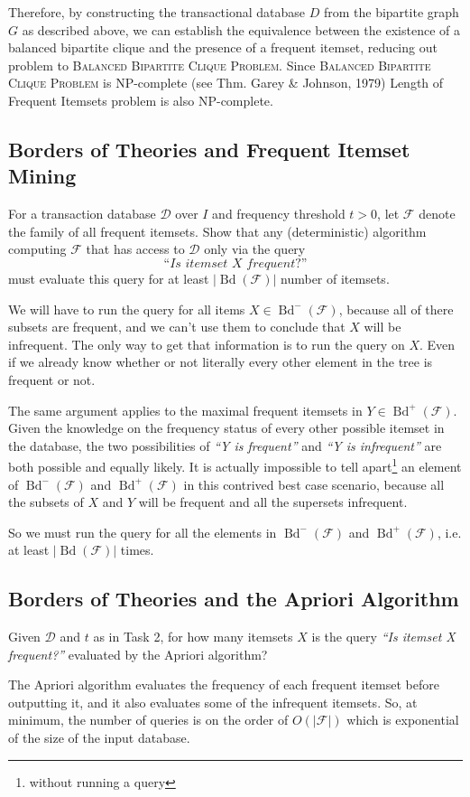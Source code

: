 \documentclass{article}
\begin{document}
  Therefore, by constructing the transactional database $D$ from the bipartite graph $G$ as described above, we can establish the equivalence between the existence of a balanced bipartite clique and the presence of a frequent itemset, reducing out problem to \textsc{Balanced Bipartite Clique Problem}.
  Since \textsc{Balanced Bipartite Clique Problem} is NP-complete (see Thm. Garey \& Johnson, 1979) Length of Frequent Itemsets problem is also NP-complete.

  \subsection{Borders of Theories and Frequent Itemset Mining}
  \begin{centerframebox}
    For a transaction database $\mathcal{D}$ over $I$ and frequency threshold $t > 0$, let $\mathcal{F}$
    denote the family of all frequent itemsets. Show that any (deterministic)
    algorithm computing $\mathcal{F}$ that has access to $\mathcal{D}$ only via the query
    \[\textit{``Is itemset X frequent?''}\]
    must evaluate this query for at least $|\operatorname{Bd}(\mathcal{F})|$ number of itemsets.
  \end{centerframebox}
  We will have to run the query for all items $X \in \operatorname{Bd}^-(\mathcal{F})$,
  because all of there subsets are frequent, and we can't use them to conclude that $X$ will be infrequent.
  The only way to get that information is to run the query on $X$.
  Even if we already know whether or not literally every other element in the tree is frequent or not.

  The same argument applies to the maximal frequent itemsets in $Y \in \operatorname{Bd}^+(\mathcal{F})$.
  Given the knowledge on the frequency status of every other possible itemset in the database,
  the two possibilities of \textit{``Y is frequent''} and \textit{``Y is infrequent''} are both possible and equally likely.
  It is actually impossible to tell apart\footnote{without running a query}
  an element of $\operatorname{Bd}^-(\mathcal{F})$ and $\operatorname{Bd}^+(\mathcal{F})$
  in this contrived best case scenario, because all the subsets of $X$ and $Y$ will be frequent and all the supersets infrequent.

  So we must run the query for all the elements in $\operatorname{Bd}^-(\mathcal{F})$ and $\operatorname{Bd}^+(\mathcal{F})$,
  i.e. at least $|\operatorname{Bd}(\mathcal{F})|$ times.

  \subsection{Borders of Theories and the Apriori Algorithm}
  \begin{centerframebox}
    Given $\mathcal{D}$ and $t$ as in Task 2, for how many itemsets $X$ is the query \textit{``Is itemset X frequent?''} evaluated by the Apriori algorithm?
  \end{centerframebox}
  The Apriori algorithm evaluates the frequency of each frequent itemset before outputting it, and it also evaluates some of the infrequent itemsets.
  So, at minimum, the number of queries is on the order of $O(|\mathcal{F}|)$ which is exponential of the size of the input database.
\end{document}
